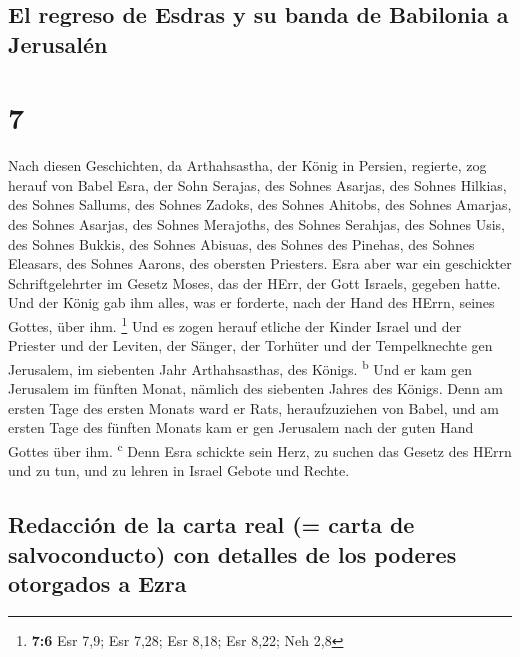 \hypertarget{el-regreso-de-esdras-y-su-banda-de-babilonia-a-jerusaluxe9n}{%
\subsection{El regreso de Esdras y su banda de Babilonia a
Jerusalén}\label{el-regreso-de-esdras-y-su-banda-de-babilonia-a-jerusaluxe9n}}

\hypertarget{section-6}{%
\section{7}\label{section-6}}

 Nach diesen Geschichten, da Arthahsastha, der König in
Persien, regierte, zog herauf von Babel Esra, der Sohn Serajas, des
Sohnes Asarjas, des Sohnes Hilkias,  des Sohnes Sallums,
des Sohnes Zadoks, des Sohnes Ahitobs,  des Sohnes
Amarjas, des Sohnes Asarjas, des Sohnes Merajoths,  des
Sohnes Serahjas, des Sohnes Usis, des Sohnes Bukkis,  des
Sohnes Abisuas, des Sohnes des Pinehas, des Sohnes Eleasars, des Sohnes
Aarons, des obersten Priesters.  Esra aber war ein
geschickter Schriftgelehrter im Gesetz Moses, das der HErr, der Gott
Israels, gegeben hatte. Und der König gab ihm alles, was er forderte,
nach der Hand des HErrn, seines Gottes, über ihm. \footnote{\textbf{7:6}
  Esr 7,9; Esr 7,28; Esr 8,18; Esr 8,22; Neh 2,8}  Und es
zogen herauf etliche der Kinder Israel und der Priester und der Leviten,
der Sänger, der Torhüter und der Tempelknechte gen Jerusalem, im
siebenten Jahr Arthahsasthas, des Königs. \textsuperscript{b}
 Und er kam gen Jerusalem im fünften Monat, nämlich des
siebenten Jahres des Königs.  Denn am ersten Tage des
ersten Monats ward er Rats, heraufzuziehen von Babel, und am ersten Tage
des fünften Monats kam er gen Jerusalem nach der guten Hand Gottes über
ihm. \textsuperscript{c}  Denn Esra schickte sein Herz,
zu suchen das Gesetz des HErrn und zu tun, und zu lehren in Israel
Gebote und Rechte.

\hypertarget{redacciuxf3n-de-la-carta-real-carta-de-salvoconducto-con-detalles-de-los-poderes-otorgados-a-ezra}{%
\subsection{Redacción de la carta real (= carta de salvoconducto) con
detalles de los poderes otorgados a
Ezra}\label{redacciuxf3n-de-la-carta-real-carta-de-salvoconducto-con-detalles-de-los-poderes-otorgados-a-ezra}}

